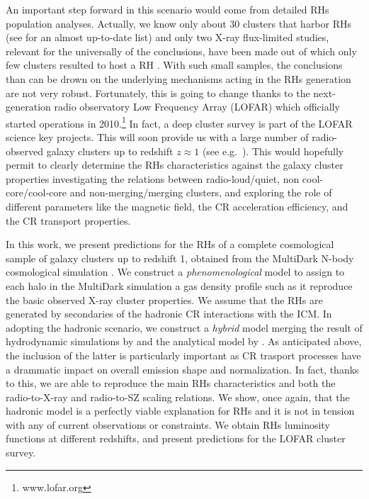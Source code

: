 \documentclass[traditabstract]{aa}
\begin{document}
An important step forward in this scenario would come from detailed RHs population analyses. Actually, we know only about 30 clusters that harbor RHs (see 
\citealp{2011A&A...527A..99E} for an almost up-to-date list) and only two X-ray flux-limited studies, relevant for the universally of the conclusions, 
have been made out of which only few clusters resulted to host a RH  \citep{1999NewA....4..141G,VenturiGMRT_2}. With such small samples, the
conclusions than can be drown on the underlying mechanisms acting in the RHs generation are not very robust. Fortunately, this is going to change thanks to 
the next-generation radio observatory Low Frequency Array (LOFAR) which officially started operations in 2010.\footnote[2]{www.lofar.org}
In fact, a deep cluster survey is part of the LOFAR science key projects. This will soon provide us with a large number of radio-observed galaxy clusters 
up to redshift $z\approx1$ (see e.g.~\citealp{2010A&A...509A..68C,2012JApA..tmp...34R}).
This would hopefully permit to clearly determine the RHs characteristics against the galaxy cluster properties investigating the relations between 
radio-loud/quiet, non cool-core/cool-core and non-merging/merging clusters, and exploring the role of different parameters like the magnetic field, 
the CR acceleration efficiency, and the CR transport properties.

In this work, we present predictions for the RHs of a complete cosmological sample of galaxy clusters up to redshift 1, obtained from the MultiDark N-body 
cosmological simulation \citep{2011arXiv1104.5130P}. We construct a \emph{phenomenological} model to assign to each halo in the MultiDark simulation 
a gas density profile such as it reproduce the basic observed X-ray cluster properties. We assume that the RHs are generated by secondaries of the hadronic 
CR interactions with the ICM. In adopting the hadronic scenario, we construct a \emph{hybrid} model merging the result of hydrodynamic simulations by \cite{2010MNRAS.409..449P} and the analytical model by \cite{2011A&A...527A..99E}.  As anticipated above, the inclusion of the latter is particularly important as CR trasport 
processes have a drammatic impact on overall emission shape and normalization. In fact, thanks to this, we are able to reproduce the main RHs characteristics and both
the radio-to-X-ray and radio-to-SZ scaling relations. We show, once again, that the hadronic model is a perfectly viable explanation for RHs and it is not in tension 
with any of current observations or constraints. We obtain RHs luminosity functions at different redshifts, and present predictions for the LOFAR
cluster survey. 
\end{document}
